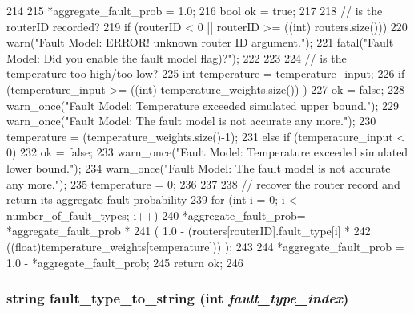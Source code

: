 \begin{DoxyCode}
214 {
215     *aggregate_fault_prob = 1.0;
216     bool ok = true;
217 
218     // is the routerID recorded?
219     if (routerID < 0 || routerID >= ((int) routers.size())){
220          warn("Fault Model: ERROR! unknown router ID argument.");
221         fatal("Fault Model: Did you enable the fault model flag)?");     
222     }
223 
224     // is the temperature too high/too low?
225     int temperature = temperature_input;
226     if (temperature_input >= ((int) temperature_weights.size()) ){
227         ok = false;
228         warn_once("Fault Model: Temperature exceeded simulated upper bound.");
229         warn_once("Fault Model: The fault model is not accurate any more.");
230         temperature = (temperature_weights.size()-1);
231     } else if (temperature_input < 0){
232         ok = false;
233         warn_once("Fault Model: Temperature exceeded simulated lower bound.");
234         warn_once("Fault Model: The fault model is not accurate any more.");
235         temperature = 0;
236     }
237 
238     // recover the router record and return its aggregate fault probability
239     for (int i = 0; i < number_of_fault_types; i++){
240         *aggregate_fault_prob=  *aggregate_fault_prob * 
241                                ( 1.0 - (routers[routerID].fault_type[i] * 
242                                  ((float)temperature_weights[temperature])) );
243     }
244     *aggregate_fault_prob = 1.0 - *aggregate_fault_prob;
245     return ok;
246 }
\end{DoxyCode}
\hypertarget{classFaultModel_a0b3a049c6918c05b4fb8a7702d65dd93}{
\subsubsection[{fault\_\-type\_\-to\_\-string}]{\setlength{\rightskip}{0pt plus 5cm}string fault\_\-type\_\-to\_\-string (int {\em fault\_\-type\_\-index})}}
\label{classFaultModel_a0b3a049c6918c05b4fb8a7702d65dd93}



